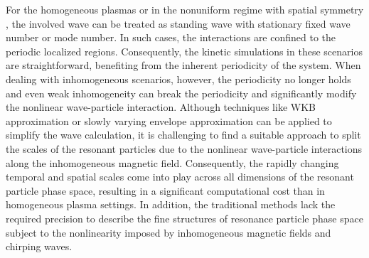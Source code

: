 \documentclass[times,12pt,3p,longtitle]{elsarticle}
\begin{document}
For the homogeneous plasmas \cite{lilley2009,breizman2010} or in the nonuniform regime with spatial symmetry \cite{hezaveh2017,hezaveh2020,hezaveh2021}, 
the involved wave can be treated as  standing wave with stationary fixed wave number or mode number. 
In such cases, the interactions are confined to the periodic localized regions. Consequently, the kinetic simulations in these scenarios are straightforward, benefiting from the inherent periodicity of the system. 
When dealing with inhomogeneous scenarios, however, 
the periodicity no longer holds
and even weak inhomogeneity can break the periodicity and significantly modify the nonlinear wave-particle interaction.
Although  techniques like WKB approximation \cite{wkb} or slowly varying envelope approximation \cite{svap} can be applied to simplify the wave calculation, it is challenging to find a suitable approach to split the scales of the resonant particles due to the nonlinear wave-particle interactions along the inhomogeneous magnetic field.
Consequently, the rapidly changing temporal and spatial scales come into play across all dimensions of the resonant particle phase space, resulting in a significant computational cost than in homogeneous plasma settings.
In addition, the traditional methods lack the required precision to describe  the fine structures of resonance particle phase space
subject to the nonlinearity imposed by inhomogeneous magnetic fields and chirping waves.
\end{document}
